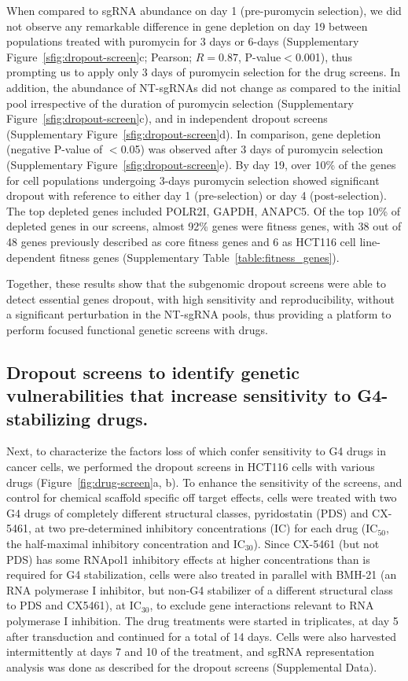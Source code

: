 When compared to sgRNA abundance on day 1 (pre-puromycin selection), we did not observe any remarkable difference in gene depletion on day 19 between populations treated with puromycin for 3 days or 6-days (Supplementary Figure~\ref{sfig:dropout-screen}c; Pearson; $R=0.87$, P-value$<$0.001), thus prompting us to apply only 3 days of puromycin selection for the drug screens. 
In addition, the abundance of NT-sgRNAs did not change as compared to the initial pool irrespective of the duration of puromycin selection (Supplementary Figure~\ref{sfig:dropout-screen}c), and in independent dropout screens (Supplementary Figure~\ref{sfig:dropout-screen}d). 
In comparison, gene depletion (negative P-value of $<$0.05) was observed after 3 days of puromycin selection (Supplementary Figure~\ref{sfig:dropout-screen}e). 
By day 19, over 10\% of the genes for cell populations undergoing 3-days puromycin selection showed significant dropout with reference to either day 1 (pre-selection) or day 4 (post-selection). 
The top depleted genes included POLR2I, GAPDH, ANAPC5. Of the top 10\% of depleted genes in our screens, almost 92\% genes were fitness genes, with 38 out of 48 genes previously described as core fitness genes and 6 as HCT116 cell line-dependent fitness genes (Supplementary Table~\ref{table:fitness_genes})\cite{Hart2015}.

Together, these results show that the subgenomic dropout screens were able to detect essential genes dropout, with high sensitivity and reproducibility, without a significant perturbation in the NT-sgRNA pools, thus providing a platform to perform focused functional genetic screens with drugs. 

\subsection{Dropout screens to identify genetic vulnerabilities that increase sensitivity to G4-stabilizing drugs.}
Next, to characterize the factors loss of which confer sensitivity to G4 drugs in cancer cells, we performed the dropout screens in HCT116 cells with various drugs (Figure~\ref{fig:drug-screen}a, b). 
To enhance the sensitivity of the screens, and control for chemical scaffold specific off target effects, cells were treated with two G4 drugs of completely different structural classes, pyridostatin (PDS) and CX-5461, at two pre-determined inhibitory concentrations (IC) for each drug (IC$_{50}$, the half-maximal inhibitory concentration and IC$_{30}$). 
Since CX-5461 (but not PDS) has some RNApol1 inhibitory effects at higher concentrations than is required for G4 stabilization\cite{Xu2017}, cells were also treated in parallel with BMH-21 (an RNA polymerase I inhibitor, but non-G4 stabilizer of a different structural class to PDS and CX5461), at IC$_{30}$, to exclude gene interactions relevant to RNA polymerase I inhibition. 
The drug treatments were started in triplicates, at day 5 after transduction and continued for a total of 14 days. 
Cells were also harvested intermittently at days 7 and 10 of the treatment, and sgRNA representation analysis was done as described for the dropout screens (Supplemental Data).  

